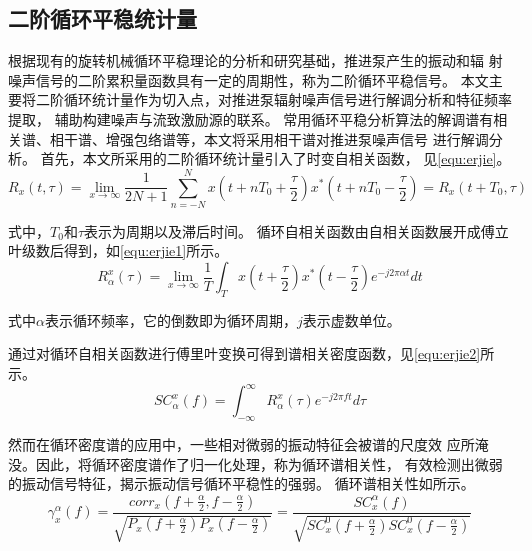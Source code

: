 \subsection{二阶循环平稳统计量}
根据现有的旋转机械循环平稳理论的分析和研究基础，推进泵产生的振动和辐
射噪声信号的二阶累积量函数具有一定的周期性，称为二阶循环平稳信号。
本文主要将二阶循环统计量作为切入点，对推进泵辐射噪声信号进行解调分析和特征频率提取，
辅助构建噪声与流致激励源的联系。
常用循环平稳分析算法的解调谱有相关谱、相干谱、增强包络谱等，本文将采用相干谱对推进泵噪声信号
进行解调分析。
首先，本文所采用的二阶循环统计量引入了时变自相关函数，
见\autoref{equ:erjie}。 
\begin{equation}
    \label{equ:erjie}
    R_{x} \left ( t,\tau  \right ) =\lim_{x \to \infty} \frac{1}{2N+1} \sum_{n=-N}^{N} x\left ( t+nT_0+\frac{\tau }{2}  \right )x^{\ast }\left ( t+nT_0-\frac{\tau }{2}  \right )=R_{x}\left ( t+T_0,\tau  \right )    
\end{equation}

式中，$T_0$和$\tau$表示为周期以及滞后时间。
循环自相关函数由自相关函数展开成傅立叶级数后得到，如\autoref{equ:erjie1}所示。
\begin{equation}
    \label{equ:erjie1}
    R_{\alpha }^{x} \left ( \tau  \right ) =\lim_{x \to \infty} \frac{1}{T}\int_{T}^{}x\left ( t+\frac{\tau }{2}  \right )x^{\ast } \left ( t-\frac{\tau }{2} \right ) e^{-j2\pi \alpha t} dt   
\end{equation}

式中$\alpha$表示循环频率，它的倒数即为循环周期，$j$表示虚数单位。

通过对循环自相关函数进行傅里叶变换可得到谱相关密度函数，见\autoref{equ:erjie2}所示。
\begin{equation}
    \label{equ:erjie2}
    SC_{\alpha }^{x} \left ( f  \right ) =\int_{-\infty }^{\infty } R_{\alpha }^{x}\left ( \tau  \right )  e^{-j2\pi f t} d\tau   
\end{equation}

然而在循环密度谱的应用中，一些相对微弱的振动特征会被谱的尺度效
应所淹没。因此，将循环密度谱作了归一化处理，称为循环谱相关性，
有效检测出微弱的振动信号特征，揭示振动信号循环平稳性的强弱。
循环谱相关性如所示。
\begin{equation}
    \label{equ:two2}
    \gamma _{x}^{\alpha}\left ( f \right ) =\frac{corr_{x}\left ( f+\frac{\alpha }{2}, f-\frac{\alpha }{2} \right )  }{\sqrt{P_{x}\left ( f+\frac{\alpha }{2} \right )P_{x}\left ( f-\frac{\alpha }{2} \right ) } } =\frac{SC_{x}^{\alpha }\left ( f \right )  }{\sqrt{SC_{x}^{0} \left ( f+\frac{\alpha }{2} \right )SC_{x}^{0} \left ( f-\frac{\alpha }{2} \right )} }  
\end{equation}

